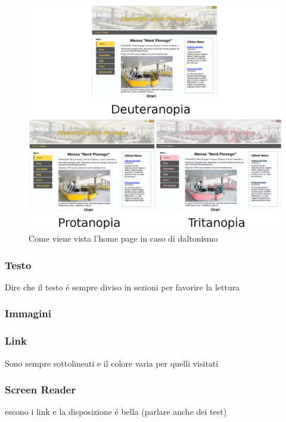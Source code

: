 \documentclass[10pt,a4paper,onecolumn]{article}
\begin{document}
\begin{figure}[h]
\centering
\includegraphics[scale=0.25]{home_colors}
\caption{Come viene vista l'home page in caso di daltonismo}
\label{colors}
\end{figure}

\subsubsection{Testo}

Dire che il testo \'e sempre diviso in sezioni per favorire la lettura

\subsubsection{Immagini}

\subsubsection{Link}

Sono sempre sottolineati e il colore varia per quelli visitati

\subsubsection{Screen Reader}

escono i link e la disposizione \'e bella (parlare anche dei test)

\clearpage
\end{document}
